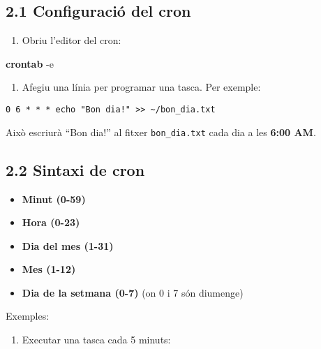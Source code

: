 \documentclass[
  12 pt,
  a4paper,
]{article}
\newenvironment{Shaded}{\begin{snugshade}}{\end{snugshade}}
\newcommand{\AttributeTok}[1]{\textcolor[rgb]{0.13,0.29,0.53}{#1}}
\newcommand{\FunctionTok}[1]{\textcolor[rgb]{0.13,0.29,0.53}{\textbf{#1}}}
\providecommand{\tightlist}{%
  \setlength{\itemsep}{0pt}\setlength{\parskip}{0pt}}
\begin{document}
\subsection{2.1 Configuració del cron}\label{configuraciuxf3-del-cron}

\begin{enumerate}
\def\labelenumi{\arabic{enumi}.}
\tightlist
\item
  Obriu l'editor del cron:
\end{enumerate}

\begin{Shaded}
\begin{Highlighting}[]
\FunctionTok{crontab} \AttributeTok{{-}e}
\end{Highlighting}
\end{Shaded}

\begin{enumerate}
\def\labelenumi{\arabic{enumi}.}
\setcounter{enumi}{1}
\tightlist
\item
  Afegiu una línia per programar una tasca. Per exemple:
\end{enumerate}

\begin{verbatim}
0 6 * * * echo "Bon dia!" >> ~/bon_dia.txt
\end{verbatim}

Això escriurà ``Bon dia!'' al fitxer \texttt{bon\_dia.txt} cada dia a
les \textbf{6:00 AM}.

\subsection{2.2 Sintaxi de cron}\label{sintaxi-de-cron}

\begin{itemize}
\item
  \textbf{Minut (0-59)}
\item
  \textbf{Hora (0-23)}
\item
  \textbf{Dia del mes (1-31)}
\item
  \textbf{Mes (1-12)}
\item
  \textbf{Dia de la setmana (0-7)} (on 0 i 7 són diumenge)
\end{itemize}

Exemples:

\begin{enumerate}
\def\labelenumi{\arabic{enumi}.}
\tightlist
\item
  Executar una tasca cada 5 minuts:
\end{enumerate}
\end{document}
